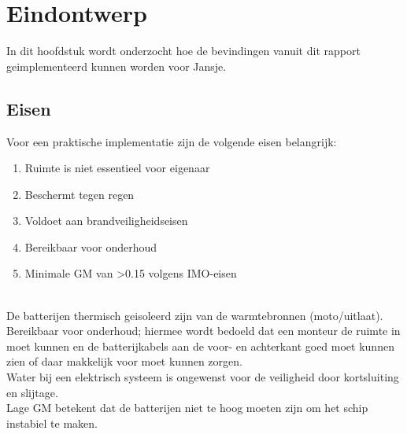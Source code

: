 \chapter{Eindontwerp}
In dit hoofdstuk wordt onderzocht hoe de bevindingen vanuit dit rapport geimplementeerd kunnen worden voor Jansje.\\

\section{Eisen}
Voor een praktische implementatie zijn de volgende eisen belangrijk:
\begin{enumerate}
    \item Ruimte is niet essentieel voor eigenaar
    \item Beschermt tegen regen
    \item Voldoet aan brandveiligheidseisen
    \item Bereikbaar voor onderhoud
    \item Minimale GM van >0.15 volgens IMO-eisen \cite{IMO_A749}
  
\end{enumerate}\\


De batterijen thermisch geisoleerd zijn van de warmtebronnen (moto/uitlaat).\\
Bereikbaar voor onderhoud; hiermee wordt bedoeld dat een monteur de ruimte in moet kunnen en de batterijkabels aan de voor- en achterkant goed moet kunnen zien of daar makkelijk voor moet kunnen zorgen.\\
Water bij een elektrisch systeem is ongewenst voor de veiligheid door kortsluiting en slijtage.\\
Lage GM betekent dat de batterijen niet te hoog moeten zijn om het schip instabiel te maken.
